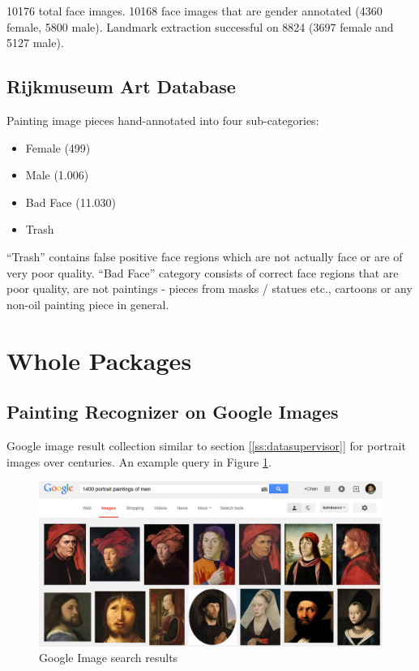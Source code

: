 \documentclass[runningheads]{llncs}
\begin{document}
10176 total face images. 10168 face images that are gender annotated (4360 female, 5800 male). Landmark extraction successful on 8824 (3697 female and 5127 male).

\subsection{Rijkmuseum Art Database}\label{ss-dbRijk}
Painting\cite{rijksmuseum1976tot} image pieces hand-annotated into four sub-categories:

\begin{itemize}
	\item Female (499)
	\item Male (1.006)
	\item Bad Face (11.030)
	\item Trash
\end{itemize}

“Trash” contains false positive face regions which are not actually face or are of very poor quality. “Bad Face” category consists of correct face regions that are poor quality, are not paintings - pieces from masks / statues etc., cartoons or any non-oil painting piece in general.


\section{Whole Packages}

\subsection{Painting Recognizer on Google Images}

Google image result collection similar to section \ref{[ss:datasupervisor]} for portrait images over centuries. An example query in Figure \ref{pr-googleres}.

\begin{figure}
	\centering
	\includegraphics[width=.8\textwidth]{PaintingRecognizer-query_results}
	\caption{Google Image search results}
	\label{pr-googleres}	
\end{figure}
\end{document}

